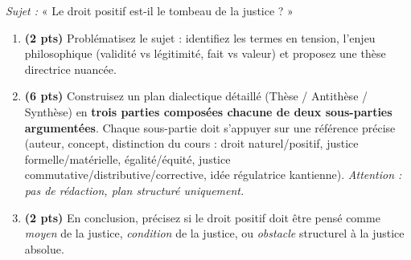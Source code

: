 \documentclass[11pt]{article}
\begin{document}
\begin{exercice}
\textit{Sujet :} « Le droit positif est-il le tombeau de la justice ? »
\begin{enumerate}
    \item \textbf{(2 pts)} Problématisez le sujet : identifiez les termes en tension, l'enjeu philosophique (validité vs légitimité, fait vs valeur) et proposez une thèse directrice nuancée.
    \item \textbf{(6 pts)} Construisez un plan dialectique détaillé (Thèse / Antithèse / Synthèse) en \textbf{trois parties composées chacune de deux sous-parties argumentées}. Chaque sous-partie doit s'appuyer sur une référence précise (auteur, concept, distinction du cours : droit naturel/positif, justice formelle/matérielle, égalité/équité, justice commutative/distributive/corrective, idée régulatrice kantienne). \textit{Attention : pas de rédaction, plan structuré uniquement.}
    \item \textbf{(2 pts)} En conclusion, précisez si le droit positif doit être pensé comme \textit{moyen} de la justice, \textit{condition} de la justice, ou \textit{obstacle} structurel à la justice absolue.
\end{enumerate}
\end{exercice}
\end{document}
